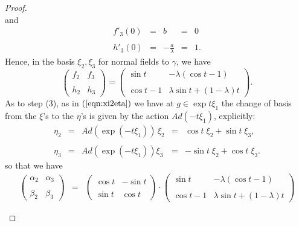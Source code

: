 \documentclass[12pt,reqno]{amsart}\usepackage{amssymb,amsmath,amscd,epsfig,amsthm,enumerate,import,eufrak}
\theoremstyle{definition}
\theoremstyle{remark}
\numberwithin{equation}{section}
\theoremstyle{plain}
\theoremstyle{definition}
\def \vs {\vskip 2mm}
\theoremstyle{remark}
\numberwithin{theorem}{section}
\begin{document}
\begin{proof}
\[\]
%
\vs
and
%
\vs
%
	\[
	\begin{array}{rcccl}f'_3(0) & = & b & = & 0\\ &&&&\\ h'_3(0) & = & - \frac{a}{\lambda} & =& 1.\end{array}
	\]
	\vs
Hence, in the basis $\xi_2, \xi_3$ for normal fields to $\gamma$, we have
%
\vs
%
\begin{equation}\label{eqn:fhsols}
		\left(\begin{array}{cc} f_2 & f_3 \\&\\ h_2 & h_3 \end{array}\right) = \left(\begin{array}{cc} \sin t & - \lambda (\cos t - 1) \\&\\  \cos t - 1& \lambda \sin t + (1 - \lambda) t \end{array}\right).
\end{equation}
%
%
\vs
%
%
As to step (3), as  in $(\ref{eqn:xi2eta})$ we have at $g \in \exp t \xi_1$ the change of basis from the $\xi$'s to the $\eta$'s is given by the action $Ad(- t \xi_1)$, explicitly:
%
\vs
%
\[
	\begin{array}{rcccl}
		\eta_2 & = & Ad(\exp(- t \xi_1)) \, \xi_2 & = & \cos t \; \xi_2 + \sin t \; \xi_3, \\
			&&&&\\
		\eta_3 & = & Ad(\exp(- t \xi_1)) \xi_3 & = & - \sin t \; \xi_2 + \cos t \; \xi_3.
	\end{array}
\]
%
\vs
%
so that we have 
%
%
\vs
%
%
\[
	\begin{array}{rcl}
		\left(\begin{array}{cc} \alpha_2 & \alpha_3\\ & \\ \beta_2 & \beta_3 \end{array}\right) & = & \left( \begin{array}{cc} \cos t & - \sin t \\& \\ \sin t & \cos t \end{array}\right) \cdot  \left(\begin{array}{cc} \sin t & - \lambda (\cos t - 1) \\&\\  \cos t - 1& \lambda \sin t + (1 - \lambda) t \end{array}\right) \\ && \\

\end{array}\]
\end{proof}
\end{document}
